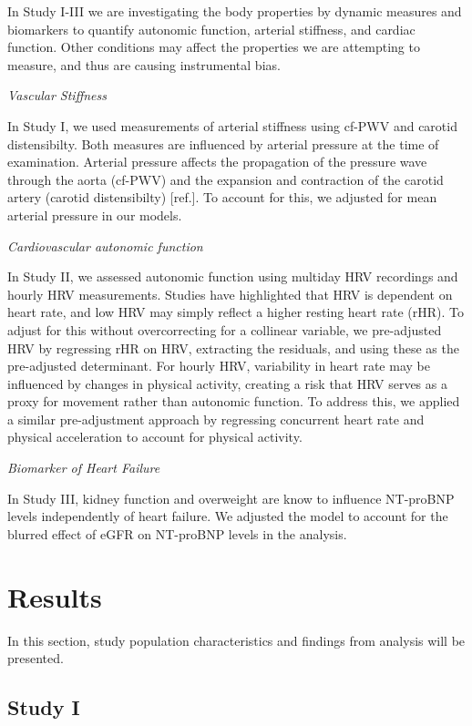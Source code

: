 \documentclass[
  a4paper,
  headsepline=true,
  open=any]{scrbook}
\begin{document}
In Study I-III we are investigating the body properties by dynamic
measures and biomarkers to quantify autonomic function, arterial
stiffness, and cardiac function. Other conditions may affect the
properties we are attempting to measure, and thus are causing
instrumental bias.

\emph{Vascular Stiffness}

In Study I, we used measurements of arterial stiffness using cf-PWV and
carotid distensibilty. Both measures are influenced by arterial pressure
at the time of examination. Arterial pressure affects the propagation of
the pressure wave through the aorta (cf-PWV) and the expansion and
contraction of the carotid artery (carotid distensibilty) {[}ref.{]}. To
account for this, we adjusted for mean arterial pressure in our models.

\emph{Cardiovascular autonomic function}

In Study II, we assessed autonomic function using multiday HRV
recordings and hourly HRV measurements. Studies have highlighted that
HRV is dependent on heart rate, and low HRV may simply reflect a higher
resting heart rate (rHR). To adjust for this without overcorrecting for
a collinear variable, we pre-adjusted HRV by regressing rHR on HRV,
extracting the residuals, and using these as the pre-adjusted
determinant. For hourly HRV, variability in heart rate may be influenced
by changes in physical activity, creating a risk that HRV serves as a
proxy for movement rather than autonomic function. To address this, we
applied a similar pre-adjustment approach by regressing concurrent heart
rate and physical acceleration to account for physical activity.

\emph{Biomarker of Heart Failure}

In Study III, kidney function and overweight are know to influence
NT-proBNP levels independently of heart failure. We adjusted the model
to account for the blurred effect of eGFR on NT-proBNP levels in the
analysis.


\hypertarget{results}{%
\chapter{Results}\label{results}}

In this section, study population characteristics and findings from
analysis will be presented.

\hypertarget{study-i}{%
\section{Study I}\label{study-i}}
\end{document}

